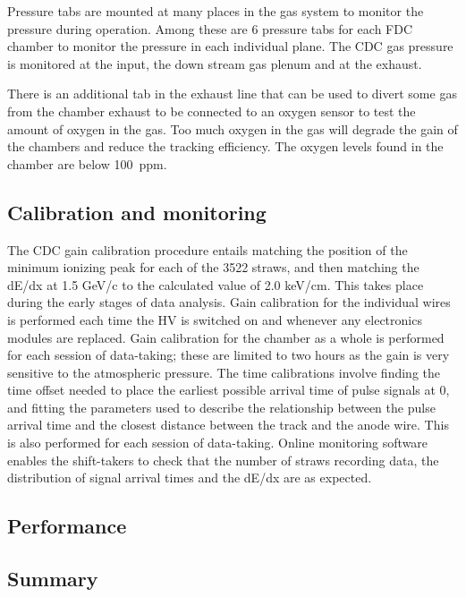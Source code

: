 Pressure tabs are mounted at many places in the gas system to monitor the pressure during operation. Among these are
6 pressure tabs for each FDC chamber to monitor the pressure in each individual plane. The CDC gas pressure is monitored
at the input, the down stream gas plenum and at the exhaust.

There is an additional tab in the exhaust line that can be used to divert some gas from the chamber exhaust to be connected
to an oxygen sensor to test the amount of oxygen in the gas. Too much oxygen in the gas will degrade the gain of
the chambers and reduce the tracking efficiency. The oxygen levels found in the chamber are below 100~ppm. 

\subsection{Calibration and monitoring \label{sec:dccalib}}
The CDC gain calibration procedure entails matching the position of the minimum ionizing peak for each of the 3522 straws, and then matching the dE/dx at 1.5 GeV/c to the calculated value of 2.0 keV/cm. 
This takes place during the early stages of data analysis.
Gain calibration for the individual wires is performed each time the HV is switched on and whenever any electronics modules are replaced. 
Gain calibration for the chamber as a whole is performed for each session of data-taking; these are limited to two hours as the gain is very sensitive to the atmospheric pressure.
The time calibrations involve finding the time offset needed to place the earliest possible arrival time of pulse signals at 0, and fitting the parameters used to describe the relationship between the pulse arrival time and the closest distance between the track and the anode wire. This is also performed for each session of data-taking. 
Online monitoring software enables the shift-takers to check that the number of straws recording data, the distribution of signal arrival times and the dE/dx are as expected. 

\subsection{Performance \label{sec:dcperformance}}



\subsection{Summary \label{sec:dcsummary}}
 
